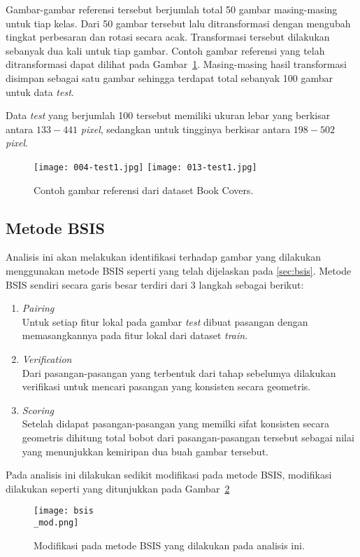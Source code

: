 Gambar-gambar referensi tersebut berjumlah total 50 gambar masing-masing untuk tiap kelas. Dari 50 gambar tersebut lalu ditransformasi dengan mengubah tingkat perbesaran dan rotasi secara acak. Transformasi tersebut dilakukan sebanyak dua kali untuk tiap gambar. Contoh gambar referensi yang telah ditransformasi dapat dilihat pada Gambar~\ref{fig:transformasi_book_covers}. Masing-masing hasil transformasi disimpan sebagai satu gambar sehingga terdapat total sebanyak 100 gambar untuk data \textit{test}.

Data \textit{test} yang berjumlah 100 tersebut memiliki ukuran lebar yang berkisar antara $133 - 441$ \textit{pixel}, sedangkan untuk tingginya berkisar antara $198 - 502$ \textit{pixel}.

\begin{figure}[H]
	\centering
	\texttt{[image: 004-test1.jpg]}
	\texttt{[image: 013-test1.jpg]}
	\caption{Contoh gambar referensi dari dataset Book Covers.}
	\label{fig:transformasi_book_covers}
\end{figure}

\subsection{Metode BSIS}
Analisis ini akan melakukan identifikasi terhadap gambar yang dilakukan menggunakan metode BSIS seperti yang telah dijelaskan pada \ref{sec:bsis}. Metode BSIS sendiri secara garis besar terdiri dari 3 langkah sebagai berikut:
\begin{enumerate}
	\item \textit{Pairing} \\
	Untuk setiap fitur lokal pada gambar \textit{test} dibuat pasangan dengan memasangkannya pada fitur lokal dari dataset \textit{train}.
	\item \textit{Verification} \\
	Dari pasangan-pasangan yang terbentuk dari tahap sebelumya dilakukan verifikasi untuk mencari pasangan yang konsisten secara geometris.
	\item \textit{Scoring} \\
	Setelah didapat pasangan-pasangan yang memilki sifat konsisten secara geometris dihitung total bobot dari pasangan-pasangan tersebut sebagai nilai yang menunjukkan kemiripan dua buah gambar tersebut.
\end{enumerate}
Pada analisis ini dilakukan sedikit modifikasi pada metode BSIS, modifikasi dilakukan seperti yang ditunjukkan pada Gambar~\ref{fig:bsis_mod}
\begin{figure}[H]
	\centering
	\texttt{[image: bsis\\\_mod.png]}
	\caption{Modifikasi pada metode BSIS yang dilakukan pada analisis ini.}
	\label{fig:bsis_mod}
\end{figure}

